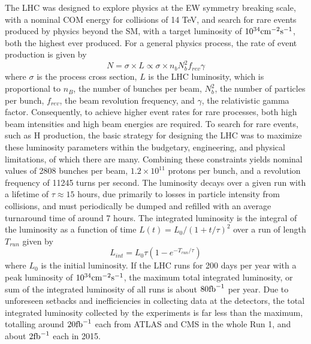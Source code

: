 \indent The LHC was designed to explore physics at the EW symmetry breaking scale, with a nominal COM energy for collisions of 14 TeV, and search for rare events produced by physics beyond the SM, with a target luminosity of $10^{34} \rm{cm}^{-2} \rm{s}^{-1}$, both the highest ever produced. For a general physics process, the rate of event production is given by
\begin{equation}
N = \sigma \times L \propto \sigma \times n_b N_b^2 f_{rev} \gamma
\end{equation}
where $\sigma$ is the process cross section, $L$ is the LHC luminosity, which is proportional to $n_B$, the number of bunches per beam, $N_b^2$, the number of particles per bunch, $f_{rev}$, the beam revolution frequency, and $\gamma$, the relativistic gamma factor. Consequently, to achieve higher event rates for rare processes, both high beam intensities and high beam energies are required. To search for rare events, such as H production, the basic strategy for designing the LHC was to maximize these luminosity parameters within the budgetary, engineering, and physical limitations, of which there are many. Combining these constraints yields nominal values of 2808 bunches per beam, $1.2\times10^{11}$ protons per bunch, and a revolution frequency of 11245 turns per second. The luminosity decays over a given run with a lifetime of $\tau \approx 15$ hours, due primarily to losses in particle intensity from collisions, and must periodically be dumped and refilled with an average turnaround time of around 7 hours. The integrated luminosity is the integral of the luminosity as a function of time $L(t) = L_0 / (1+t/\tau)^2$ over a run of length $T_{run}$ given by
\begin{equation}
L_{int} = L_0 \tau (1-e^{-T_{run}/\tau})
\end{equation}
where $L_0$ is the initial luminosity. If the LHC runs for 200 days per year with a peak luminosity of $10^{34} \rm{cm}^{-2} \rm{s}^{-1}$, the maximum total integrated luminosity, or sum of the integrated luminosity of all runs is about $80 \rm{fb}^{-1}$ per year. Due to unforeseen setbacks and inefficiencies in collecting data at the detectors, the total integrated luminosity collected by the experiments is far less than the maximum, totalling around $20 \rm{fb}^{-1}$ each from ATLAS and CMS in the whole Run 1, and about $2 \rm{fb}^{-1}$ each in 2015. 

